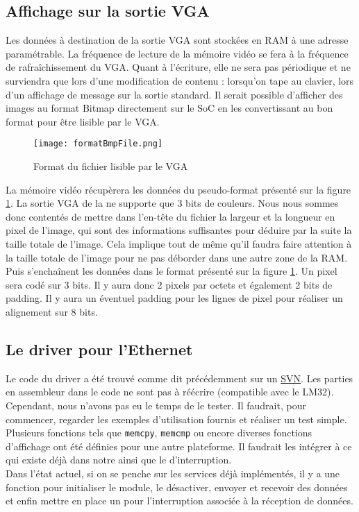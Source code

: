 \subsection{Affichage sur la sortie VGA}

Les données à destination de la sortie VGA sont stockées en RAM à une adresse paramétrable. La fréquence de lecture de la mémoire vidéo se fera à la fréquence de rafraîchissement du VGA. Quant à l'écriture, elle ne sera pas périodique et ne surviendra que lors d'une modification de contenu : lorsqu'on tape au clavier, lors d'un affichage de message sur la sortie standard. Il serait possible d'afficher des images au format Bitmap directement sur le SoC en les convertissant au bon format pour être lisible par le VGA.

\begin{figure}[h!]
\centering
\texttt{[image: formatBmpFile.png]}
\caption{Format du fichier lisible par le VGA}
\label{format-bitmap-vga}
\end{figure}

La mémoire vidéo récupèrera les données du pseudo-format présenté sur la figure \ref{format-bitmap-vga}. La sortie VGA de la \nexys{} ne supporte que 3 bits de couleurs. Nous nous sommes donc contentés de mettre dans l'en-tête du fichier la largeur et la longueur en pixel de l'image, qui sont des informations suffisantes pour déduire par la suite la taille totale de l'image. Cela implique tout de même qu'il faudra faire attention à la taille totale de l'image pour ne pas déborder dans une autre zone de la RAM. Puis s'enchaînent les données dans le format présenté sur la figure \ref{format-bitmap-vga}. Un pixel sera codé sur 3 bits. Il y aura donc 2 pixels par octets et également 2 bits de padding. Il y aura un éventuel padding pour les lignes de pixel pour réaliser un alignement sur 8 bits.

\subsection{Le driver pour l'Ethernet}

Le code du driver a été trouvé comme dit précédemment sur un \href{http://svn.ohwr.org/lm32/crt/mac/}{SVN}. Les parties en assembleur dans le code ne sont pas à réécrire (compatible avec le LM32). Cependant, nous n'avons pas eu le temps de le tester. Il faudrait, pour commencer, regarder les exemples d'utilisation fournis et réaliser un test simple.\\
Plusieurs fonctions tels que \texttt{memcpy}, \texttt{memcmp} ou encore diverses fonctions d'affichage ont été définies pour une autre plateforme. Il faudrait les intégrer à ce qui existe déjà dans notre  ainsi que le  d'interruption.\\
Dans l'état actuel, si on se penche sur les services déjà implémentés, il y a une fonction pour initialiser le module, le désactiver, envoyer et recevoir des données et enfin mettre en place un  pour l'interruption associée à la réception de données.

